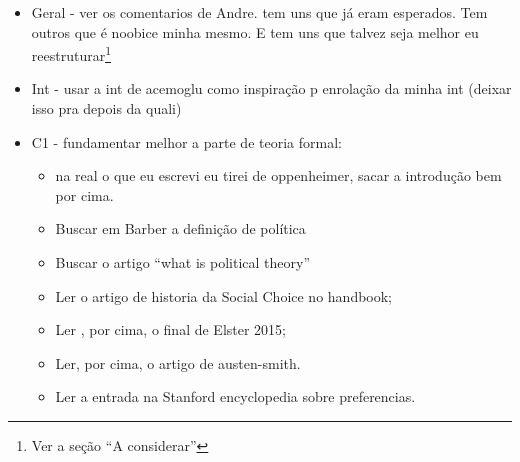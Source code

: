 \documentclass{article}
\begin{document}
\begin{itemize}

\item {\Large Geral - ver os comentarios de Andre. tem uns que já eram
    esperados. Tem outros que é noobice minha mesmo. E tem uns que talvez seja
    melhor eu reestruturar\footnote{\textcolor{base01}{Ver a seção ``A
        considerar''}}}
\item {\Large Int - usar a int de acemoglu como inspiração p enrolação da minha
    int (deixar isso pra depois da quali)}
\item {\Large C1  - fundamentar melhor a parte de teoria formal}:
  \begin{itemize}

  \item na real o que eu escrevi eu tirei de oppenheimer, sacar a introdução bem
    por cima.
  \item Buscar em Barber a definição de política
  \item Buscar o artigo ``what is political theory''
  \item Ler o artigo de historia da Social Choice no handbook;
  \item Ler , por cima, o  final de Elster 2015;
  \item Ler, por cima,  o artigo de austen-smith.
  \item Ler a entrada na Stanford encyclopedia sobre preferencias.
    
  \end{itemize}


\end{itemize}
\end{document}
